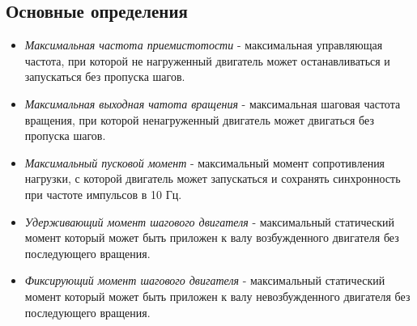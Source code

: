 \newpage
\subsection{ Основные определения }

\begin{itemize}
    \item \textit{Максимальная частота приемистотости} - максимальная управляющая частота,
    при которой не нагруженный двигатель может останавливаться и запускаться без пропуска шагов.

    \item \textit{Максимальная выходная чатота вращения} - максимальная шаговая частота вращения,
    при которой ненагруженный двигатель может двигаться без пропуска шагов.

    \item \textit{Максимальный пусковой момент} - максимальный момент сопротивления нагрузки,
    с которой двигатель может запускаться и сохранять синхронность при частоте импульсов в 10 Гц.

    \item \textit{Удерживающий момент шагового двигателя} - максимальный статический момент
    который может быть приложен к валу возбужденного двигателя без последующего вращения.

    \item \textit{Фиксирующий момент шагового двигателя} - максимальный статический момент
    который может быть приложен к валу невозбужденного двигателя без последующего вращения.
\end{itemize}
